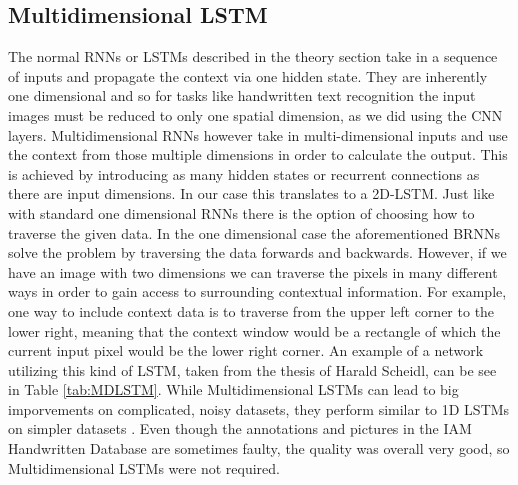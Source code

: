 \documentclass{article}
\begin{document}
\subsection{Multidimensional LSTM}
The normal RNNs or LSTMs described in the theory section take in a sequence of inputs and propagate the context via one hidden state. They are inherently one dimensional and so for tasks like handwritten text recognition the input images must be reduced to only one spatial dimension, as we did using the CNN layers. Multidimensional RNNs however take in multi-dimensional inputs and use the context from those multiple dimensions in order to calculate the output\cite{Graves}. This is achieved by introducing as many hidden states or recurrent connections as there are input dimensions. In our case this translates to a 2D-LSTM. Just like with standard one dimensional RNNs there is the option of choosing how to traverse the given data. In the one dimensional case the aforementioned BRNNs solve the problem by traversing the data forwards and backwards. However, if we have an image with two dimensions we can traverse the pixels in many different ways in order to gain access to surrounding contextual information. For example, one way to include context data is to traverse from the upper left corner to the lower right, meaning that the context window would be a rectangle of which the current input pixel would be the lower right corner. An example of a network utilizing this kind of LSTM, taken from the thesis of Harald Scheidl\cite{ScheidlThesis}, can be see in Table \ref{tab:MDLSTM}. While Multidimensional LSTMs can lead to big imporvements on complicated, noisy datasets, they perform similar to 1D LSTMs on simpler datasets  \cite{Moysset}. Even though the annotations and pictures in the IAM Handwritten Database are sometimes faulty, the quality was overall very good, so Multidimensional LSTMs were not required.
\end{document}
